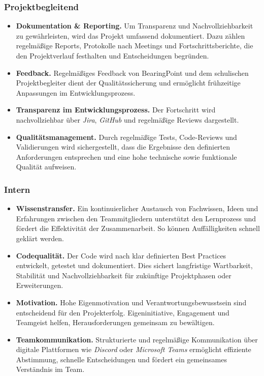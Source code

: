 \documentclass{article}
\begin{document}
\subsubsection*{Projektbegleitend}
\begin{itemize}
  \item \textbf{Dokumentation \& Reporting.} Um Transparenz und Nachvollziehbarkeit zu gewährleisten, wird das Projekt umfassend dokumentiert. Dazu zählen regelmäßige Reports, Protokolle nach Meetings und Fortschrittsberichte, die den Projektverlauf festhalten und Entscheidungen begründen.
  \item \textbf{Feedback.} Regelmäßiges Feedback von BearingPoint und dem schulischen Projektbegleiter dient der Qualitätssicherung und ermöglicht frühzeitige Anpassungen im Entwicklungsprozess.
  \item \textbf{Transparenz im Entwicklungsprozess.} Der Fortschritt wird nachvollziehbar über \emph{Jira}, \emph{GitHub} und regelmäßige Reviews dargestellt.
  \item \textbf{Qualitätsmanagement.} Durch regelmäßige Tests, Code-Reviews und Validierungen wird sichergestellt, dass die Ergebnisse den definierten Anforderungen entsprechen und eine hohe technische sowie funktionale Qualität aufweisen.
\end{itemize}

\subsubsection*{Intern}
\begin{itemize}
  \item \textbf{Wissenstransfer.} Ein kontinuierlicher Austausch von Fachwissen, Ideen und Erfahrungen zwischen den Teammitgliedern unterstützt den Lernprozess und fördert die Effektivität der Zusammenarbeit. So können Auffälligkeiten schnell geklärt werden.
  \item \textbf{Codequalität.} Der Code wird nach klar definierten Best Practices entwickelt, getestet und dokumentiert. Dies sichert langfristige Wartbarkeit, Stabilität und Nachvollziehbarkeit für zukünftige Projektphasen oder Erweiterungen.
  \item \textbf{Motivation.} Hohe Eigenmotivation und Verantwortungsbewusstsein sind entscheidend für den Projekterfolg. Eigeninitiative, Engagement und Teamgeist helfen, Herausforderungen gemeinsam zu bewältigen.
  \item \textbf{Teamkommunikation.} Strukturierte und regelmäßige Kommunikation über digitale Plattformen wie \emph{Discord} oder \emph{Microsoft Teams} ermöglicht effiziente Abstimmung, schnelle Entscheidungen und fördert ein gemeinsames Verständnis im Team.
\end{itemize}
\end{document}
